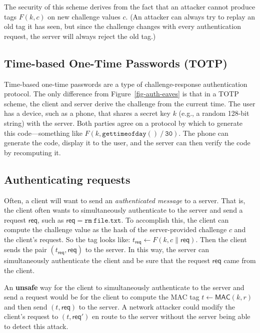 \documentclass[
  letterpaper,
]{scrbook}
\newcommand{\MAC}{\mathsf{MAC}}
\theoremstyle{definition}
\theoremstyle{plain}
\theoremstyle{plain}
\theoremstyle{remark}
\begin{document}
The security of this scheme derives from the fact that an attacker
cannot produce tags \(F(k,c)\) on new challenge values \(c\). (An
attacker can always try to replay an old tag it has seen, but since the
challenge changes with every authentication request, the server will
always reject the old tag.)

\subsection{Time-based One-Time Passwords
(TOTP)}\label{time-based-one-time-passwords-totp}

Time-based one-time passwords are a type of challenge-response
authentication protocol. The only difference from
Figure~\ref{fig-auth-eaves} is that in a TOTP scheme, the client and
server derive the challenge from the current time. The user has a
device, such as a phone, that shares a secret key \(k\) (e.g., a random
128-bit string) with the server. Both parties agree on a protocol by
which to generate this code---something like
\(F(k, \mathtt{gettimeofday()\ /\ 30})\). The phone can generate the
code, display it to the user, and the server can then verify the code by
recomputing it.

\subsection{Authenticating requests}\label{authenticating-requests}

Often, a client will want to send an \emph{authenticated message} to a
server. That is, the client often wants to simultaneously authenticate
to the server and send a request \(\mathsf{req}\), such as
\(\mathsf{req} = \mathtt{rm\ file.txt}\). To accomplish this, the client
can compute the challenge value as the hash of the server-provided
challenge \(c\) and the client's request. So the tag looks like:
\(t_{\mathsf{req}} \gets F(k, c \| \mathsf{req})\). Then the client
sends the pair \((t_{\mathsf{req}}, \mathsf{req})\) to the server. In
this way, the server can simultaneously authenticate the client and be
sure that the request \(\mathsf{req}\) came from the client.

An \textbf{unsafe} way for the client to simultaneously authenticate to
the server and send a request would be for the client to compute the MAC
tag \(t \gets \MAC(k,r)\) and then send \((t, \mathsf{req})\) to the
server. A network attacker could modify the client's request to
\((t, \mathsf{req'})\) en route to the server without the server being
able to detect this attack.
\end{document}
